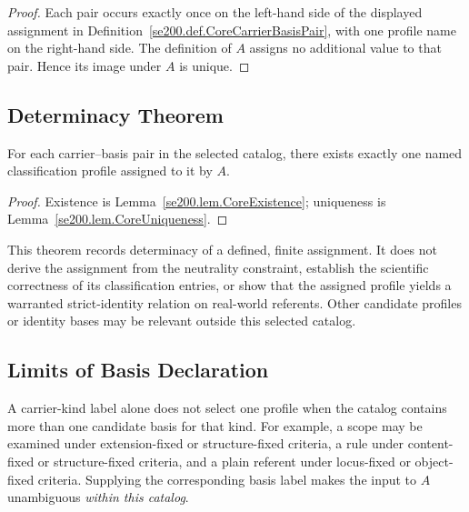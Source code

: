 \begin{proof}
Each pair occurs exactly once on the left-hand side of the displayed
assignment in Definition~\ref{se200.def.CoreCarrierBasisPair}, with
one profile name on the right-hand side.
The definition of $A$ assigns
no additional value to that pair.
Hence its image under $A$ is unique.
\end{proof}

\subsection{Determinacy Theorem}
\label{subsec:determinacy_theorem}

\begin{theorem}
\label{se200.thm.CoreRegimeAssignment}
For each carrier--basis pair in the selected catalog, there exists
exactly one named classification profile assigned to it by $A$.
\end{theorem}

\begin{proof}
Existence is Lemma~\ref{se200.lem.CoreExistence}; uniqueness is
Lemma~\ref{se200.lem.CoreUniqueness}.
\end{proof}

This theorem records determinacy of a defined, finite assignment.
It does not derive the assignment from the neutrality constraint,
establish the scientific correctness of its classification entries,
or show that the assigned profile yields a warranted strict-identity
relation on real-world referents.
Other candidate profiles or identity
bases may be relevant outside this selected catalog.

\subsection{Limits of Basis Declaration}
\label{subsec:basis_declaration_failure}

A carrier-kind label alone does not select one profile when the
catalog contains more than one candidate basis for that kind.
For example, a scope may be examined under extension-fixed or
structure-fixed criteria, a rule under content-fixed or
structure-fixed criteria, and a plain referent under locus-fixed
or object-fixed criteria.
Supplying the corresponding basis label
makes the input to $A$ unambiguous \emph{within this catalog}.

